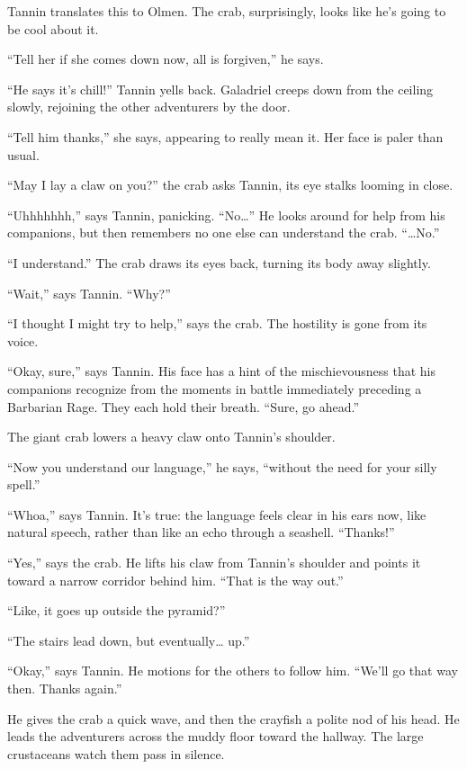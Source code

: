 \documentclass[smalldemyvopaper,11pt,twoside,onecolumn,openright,extrafontsizes]{memoir}
\begin{document}
Tannin translates this to Olmen. The crab, surprisingly, looks like he's
going to be cool about it.

``Tell her if she comes down now, all is forgiven,'' he says.

``He says it's chill!'' Tannin yells back. Galadriel creeps down from
the ceiling slowly, rejoining the other adventurers by the door.

``Tell him thanks,'' she says, appearing to really mean it. Her face is
paler than usual.

``May I lay a claw on you?'' the crab asks Tannin, its eye stalks
looming in close.

``Uhhhhhhh,'' says Tannin, panicking. ``No\ldots{}'' He looks around for
help from his companions, but then remembers no one else can understand
the crab. ``\ldots No.''

``I understand.'' The crab draws its eyes back, turning its body away
slightly.

``Wait,'' says Tannin. ``Why?''

``I thought I might try to help,'' says the crab. The hostility is gone
from its voice.

``Okay, sure,'' says Tannin. His face has a hint of the mischievousness
that his companions recognize from the moments in battle immediately
preceding a Barbarian Rage. They each hold their breath. ``Sure, go
ahead.''

The giant crab lowers a heavy claw onto Tannin's shoulder.

``Now you understand our language,'' he says, ``without the need for
your silly spell.''

``Whoa,'' says Tannin. It's true: the language feels clear in his ears
now, like natural speech, rather than like an echo through a seashell.
``Thanks!''

``Yes,'' says the crab. He lifts his claw from Tannin's shoulder and
points it toward a narrow corridor behind him. ``That is the way out.''

``Like, it goes up outside the pyramid?''

``The stairs lead down, but eventually\ldots{} up.''

``Okay,'' says Tannin. He motions for the others to follow him. ``We'll
go that way then. Thanks again.''

He gives the crab a quick wave, and then the crayfish a polite nod of
his head. He leads the adventurers across the muddy floor toward the
hallway. The large crustaceans watch them pass in silence.
\end{document}
